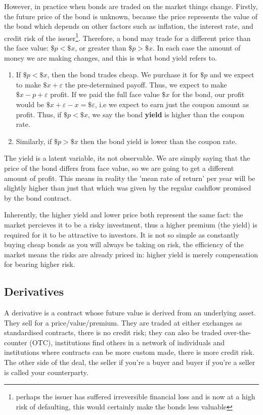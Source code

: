 \documentclass[9pt]{extarticle}
\begin{document}
However, in practice when bonds are traded on the market 
things change. Firstly, the future price 
of the bond is unknown, because the price 
represents the value of the bond which depends 
on other factors such as inflation, the interest rate, 
and credit risk of the issuer\footnote{perhaps 
the issuer has suffered irreversible financial loss 
and is now at a high risk of defaulting, this would 
certainly make the bonds less valuable}.
Therefore, a bond may trade for a different 
price than the face value: $\$ p < \$x$, or 
greater than $\$p > \$x$. In each case 
the amount of money we are making changes, and 
this is what bond yield refers to.
\begin{enumerate}[label=(\roman*)]
  \item If $\$p < \$x$, then the bond trades cheap. We purchase 
  it for $\$p$ and we expect to make $\$x + \varepsilon$ the pre-determined
  payoff. Thus, we expect to make $\$x-p+\varepsilon$ profit. If we 
  paid the full face value $\$x$ for the bond, our profit would be 
  $\$x+\varepsilon - x = \$\varepsilon$, i.e we expect to earn just 
  the coupon amount as profit. Thus, if $\$p <\$x$, we say
  the bond \textbf{yield} is higher than the coupon rate.
  \item Similarly, if $\$p > \$x$ then the bond yield is lower than 
  the coupon rate.
\end{enumerate}
The yield is a latent variable, its not observable. We are 
simply saying that the price of the bond differs from face value, so 
we are going to get a different amount of profit. This 
means in reality the 'mean rate of return' per year will be slightly higher than just 
that which was given by the regular cashflow promised by the bond contract. 

Inherently, the higher yield and lower price both represent the same fact: 
the market percieves it to be a risky investment, thus a higher premium (the yield) 
is required for it to be attractive to investors. It is not so simple 
as constantly buying cheap bonds as you will always be taking on risk, 
the efficiency of the market means the risks are already 
priced in: higher yield is merely compensation for bearing higher risk.

\subsection{Derivatives}

A derivative is a contract whose future value is derived from an underlying asset. 
They sell for a price/value/premium. They are traded at either exchanges as standardised 
contracts, there is no credit risk; they can also be traded 
over-the-counter (OTC), institutions find others in a network of individuals and institutions where contracts can 
be more custom made, there is more credit risk. The other side of the deal, the seller if you're a 
buyer and buyer if you're a seller is called your counterparty.
\end{document}
